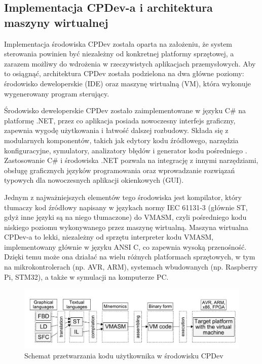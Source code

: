 \documentclass[12pt,twoside]{article}
\begin{document}
\subsection{Implementacja CPDev-a i architektura maszyny wirtualnej}

Implementacja środowiska CPDev została oparta na założeniu, że system sterowania powinien być niezależny od konkretnej platformy sprzętowej, a zarazem możliwy do wdrożenia w rzeczywistych aplikacjach przemysłowych. Aby to osiągnąć, architektura CPDev została podzielona na dwa główne poziomy: środowisko deweloperskie (IDE) oraz maszynę wirtualną (VM), która wykonuje wygenerowany program sterujący.

Środowisko deweloperskie CPDev zostało zaimplementowane w języku C\# na platformę .NET, przez co aplikacja posiada nowoczesny interfejs graficzny, zapewnia wygodę użytkowania i łatwość dalszej rozbudowy. Składa się z modularnych komponentów, takich jak edytory kodu źródłowego, narzędzia konfiguracyjne, symulatory, analizatory błędów i generator kodu pośredniego \cite{cpdevOverview}. Zastosowanie C\# i środowiska .NET pozwala na integrację z innymi narzędziami, obsługę graficznych języków programowania oraz wprowadzanie rozwiązań typowych dla nowoczesnych aplikacji okienkowych (GUI).

Jednym z najważniejszych elementów tego środowiska jest kompilator, który tłumaczy kod źródłowy napisany w językach normy IEC 61131-3 (głównie ST, gdyż inne języki są na niego tłumaczone) do VMASM, czyli pośredniego kodu niskiego poziomu wykonywanego przez maszynę wirtualną. Maszyna wirtualna CPDev-a to lekki, niezależny od sprzętu interpreter kodu VMASM, implementowany głównie w języku ANSI C, co zapewnia wysoką przenośność. Dzięki temu może ona działać na wielu różnych platformach sprzętowych, w tym na mikrokontrolerach (np. AVR, ARM), systemach wbudowanych (np. Raspberry Pi, STM32), a także w symulacji na komputerze PC\cite{cpdevVM}.

\begin{figure}[ht]
   \centering
   \includegraphics[width=15cm]{images/cpdevScheme.png}
   \caption{Schemat przetwarzania kodu użytkownika w środowisku CPDev\cite{cpdevOperations}}
   \label{Fig:cpdevScheme}
\end{figure}
\end{document}
